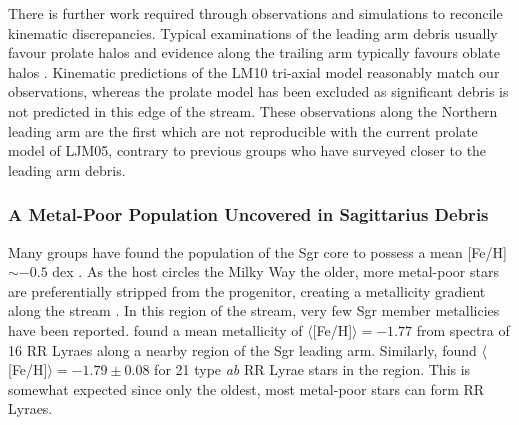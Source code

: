 \documentclass[preprint2]{aastex}
\begin{document}
	There is further work required through observations and simulations to reconcile kinematic discrepancies. Typical examinations of the leading arm debris usually favour prolate halos and evidence along the trailing arm typically favours oblate halos \citep{Helmi_2004, Martinez-Delgado;et-al_2004, Law;et-al_2005}. Kinematic predictions of the LM10 tri-axial model reasonably match our observations, whereas the prolate model has been excluded as significant debris is not predicted in this edge of the stream. These observations along the Northern leading arm are the first which are not reproducible with the current prolate model of LJM05, contrary to previous groups who have surveyed closer to the leading arm debris.

	\subsubsection{A Metal-Poor Population Uncovered in Sagittarius Debris}
	\label{sec:sgr-metal-poor}

		
	Many groups have found the population of the Sgr core to possess a mean [Fe/H] $\sim -0.5$ dex \citep{Cacciari;et-al_2002, Bonifacio;et-al_2004, Monaco;et-al_2005}. As the host circles the Milky Way the older, more metal-poor stars are preferentially stripped from the progenitor, creating a metallicity gradient along the stream \citep{Chou;et-al_2007, Keller;Yong;Da_Costa_2010}. In this region of the stream, very few Sgr member metallicies have been reported. \citet{Vivas;et-al_2005} found a mean metallicity of $\langle$[Fe/H]$\rangle = -1.77$ from spectra of 16 RR Lyraes along a nearby region of the Sgr leading arm. Similarly, \citet{Prior;et-al_2009b} found $\langle$[Fe/H]$\rangle = -1.79 \pm 0.08$ for 21 type \textit{ab} RR Lyrae stars in the region. This is somewhat expected since only the oldest, most metal-poor stars can form RR Lyraes. 
	
\end{document}
